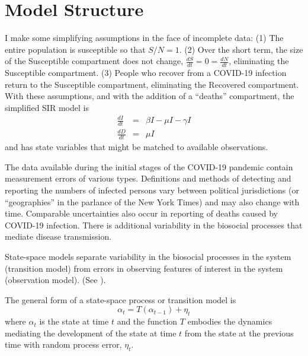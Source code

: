 \documentclass[12pt,letterpaper]{article}
\begin{document}
\section*{Model Structure}
I make some simplifying assumptions in the face of incomplete data: 
(1) The entire population is susceptible so that $S/N = 1$. 
(2) Over the short term, the size of the
Susceptible compartment does not change, 
$\frac{dS}{dt} = 0 = \frac{dN}{dt}$,
eliminating the Susceptible compartment.
(3) People who recover from a COVID-19 infection return to the Susceptible
compartment, eliminating the Recovered compartment. 
With these assumptions, and with the addition of a ``deaths''
compartment, the simplified SIR model is
\begin{eqnarray}
\label{eqn:sSIR}
\frac{dI}{dt} &=&  \beta I - \mu I -\gamma I\\
\frac{dD}{dt} &=& \mu I
\end{eqnarray}
and has state variables that might be matched to available observations.

The data available during the initial stages of the COVID-19 pandemic
contain measurement errors of various types.
Definitions and methods of detecting and reporting the numbers of
infected persons vary between political jurisdictions (or
``geographies'' in the parlance of the New York Times) and may also
change with time.
Comparable uncertainties also occur in reporting of deaths caused
by COVID-19 infection.
There is additional variability in the biosocial
processes that mediate disease transmission.

State-space models separate variability in the biosocial
processes in the system (transition model)
from errors in observing features of interest
in the system (observation model).
(See \cite{Harvey1990}).

The general form of a state-space process or transition model is
\begin{equation}
\alpha_t=T(\alpha_{t-1}) + \eta_t
\end{equation}
where $\alpha_t$ is the state at time $t$ and 
the function $T$ embodies the dynamics mediating the
development of the state at time $t$ from the state at the previous
time with random process error, $\eta_t$.
\end{document}
